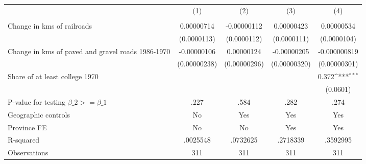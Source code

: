 {
\def\sym#1{\ifmmode^{#1}\else\(^{#1}\)\fi}
\begin{tabular}{l*{4}{c}}
\hline\hline
                &\multicolumn{1}{c}{(1)}&\multicolumn{1}{c}{(2)}&\multicolumn{1}{c}{(3)}&\multicolumn{1}{c}{(4)}\\
                &\multicolumn{1}{c}{}&\multicolumn{1}{c}{}&\multicolumn{1}{c}{}&\multicolumn{1}{c}{}\\
\hline
Change in kms of railroads&0.00000714         &-0.00000112         &0.00000423         &0.00000534         \\
                &(0.0000113)         &(0.0000112)         &(0.0000111)         &(0.0000104)         \\
[1em]
Change in kms of paved and gravel roads 1986-1970&-0.00000106         &0.00000124         &-0.00000205         &-0.000000819         \\
                &(0.00000238)         &(0.00000296)         &(0.00000320)         &(0.00000301)         \\
[1em]
Share of at least college 1970&                  &                  &                  &    0.372\sym{***}\\
                &                  &                  &                  & (0.0601)         \\
\hline
P-value for testing $\beta\_{2} >= \beta\_{1}$&     .227         &     .584         &     .282         &     .274         \\
Geographic controls&       No         &      Yes         &      Yes         &      Yes         \\
Province FE     &       No         &       No         &      Yes         &      Yes         \\
R-squared       & .0025548         & .0732625         & .2718339         & .3592995         \\
Observations    &      311         &      311         &      311         &      311         \\
\hline\hline
\end{tabular}
}
